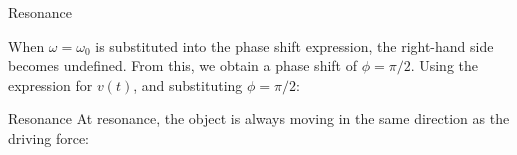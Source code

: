 \documentclass[12pt,compress,aspectratio=169]{beamer}
\begin{document}
\begin{frame}{Resonance}


  When $\omega=\omega_0$ is substituted into the phase shift expression, the
  right-hand side becomes undefined. From this, we obtain a phase shift of
  $\phi=\pi/2$. Using the expression for $v(t)$, and substituting $\phi=\pi/2$:
  
\end{frame}


\begin{frame}{Resonance}
  At resonance, the object is always moving in the same direction as the
  driving force:

\end{frame}
\end{document}
